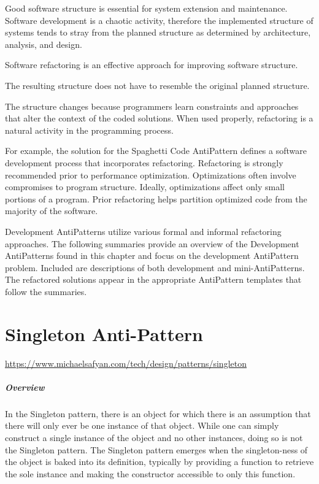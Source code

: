 \documentclass{book}
\begin{document}
Good software structure is essential for system extension and maintenance.
Software development is a chaotic activity, therefore the implemented structure of systems tends to stray from the planned structure as determined by architecture, analysis, and design.

Software refactoring is an effective approach for improving software structure.

The resulting structure does not have to resemble the original planned structure.

The structure changes because programmers learn constraints and approaches that alter the context of the coded solutions.
When used properly, refactoring is a natural activity in the programming process.

For example, the solution for the Spaghetti Code AntiPattern defines a software development process that incorporates refactoring.
Refactoring is strongly recommended prior to performance optimization. Optimizations often involve compromises to program structure.
Ideally, optimizations affect only small portions of a program. Prior refactoring helps partition optimized code from the majority of the software.

Development AntiPatterns utilize various formal and informal refactoring approaches.
The following summaries provide an overview of the Development AntiPatterns found in this chapter and focus on the development AntiPattern problem.
Included are descriptions of both development and mini-AntiPatterns. The refactored solutions appear in the appropriate AntiPattern templates that follow the summaries.
\chapter{Singleton Anti-Pattern}\label{SingletonAntiPattern}
\url{https://www.michaelsafyan.com/tech/design/patterns/singleton}
\paragraph{Overview}
In the Singleton pattern, there is an object for which there is an assumption that there will only ever be one instance of that object.
While one can simply construct a single instance of the object and no other instances, doing so is not the Singleton pattern. 
The Singleton pattern emerges when the singleton-ness of the object is baked into its definition,
typically by providing a function to retrieve the sole instance and making the constructor accessible to only this function.
\end{document}
